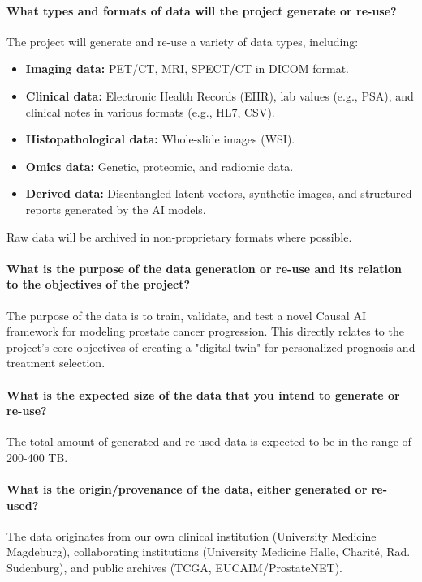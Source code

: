 \documentclass[11pt, a4paper]{article}
\begin{document}
\paragraph{What types and formats of data will the project generate or re-use?}
The project will generate and re-use a variety of data types, including:
\begin{itemize}
    \item \textbf{Imaging data:} PET/CT, MRI, SPECT/CT in DICOM format.
    \item \textbf{Clinical data:} Electronic Health Records (EHR), lab values (e.g., PSA), and clinical notes in various formats (e.g., HL7, CSV).
    \item \textbf{Histopathological data:} Whole-slide images (WSI).
    \item \textbf{Omics data:} Genetic, proteomic, and radiomic data.
    \item \textbf{Derived data:} Disentangled latent vectors, synthetic images, and structured reports generated by the AI models.
\end{itemize}
Raw data will be archived in non-proprietary formats where possible.

\paragraph{What is the purpose of the data generation or re-use and its relation to the objectives of the project?}
The purpose of the data is to train, validate, and test a novel Causal AI framework for modeling prostate cancer progression. This directly relates to the project's core objectives of creating a "digital twin" for personalized prognosis and treatment selection.

\paragraph{What is the expected size of the data that you intend to generate or re-use?}
The total amount of generated and re-used data is expected to be in the range of 200-400 TB.

\paragraph{What is the origin/provenance of the data, either generated or re-used?}
The data originates from our own clinical institution (University Medicine Magdeburg), collaborating institutions (University Medicine Halle, Charité, Rad. Sudenburg), and public archives (TCGA, EUCAIM/ProstateNET).
\end{document}
